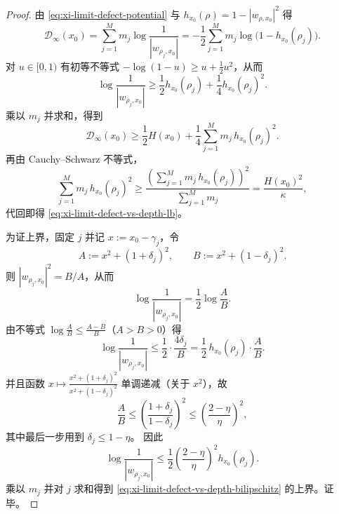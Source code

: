 \begin{proof}
由 \eqref{eq:xi-limit-defect-potential} 与
\(
h_{x_0}(\rho)=1-|w_{\rho,x_0}|^2
\)
得
\[
\mathcal{D}_\infty(x_0)
=\sum_{j=1}^{M} m_j \log\frac{1}{|w_{\rho_j,x_0}|}
=-\frac12\sum_{j=1}^{M} m_j\log\bigl(1-h_{x_0}(\rho_j)\bigr).
\]
对 \(u\in[0,1)\) 有初等不等式 \(-\log(1-u)\ge u+\frac12u^2\)，从而
\[
\log\frac{1}{|w_{\rho_j,x_0}|}
\ge \frac12 h_{x_0}(\rho_j)+\frac14 h_{x_0}(\rho_j)^2.
\]
乘以 \(m_j\) 并求和，得到
\[
\mathcal{D}_\infty(x_0)
\ge \frac12 H(x_0)+\frac14\sum_{j=1}^{M}m_j\,h_{x_0}(\rho_j)^2.
\]
再由 Cauchy--Schwarz 不等式，
\[
\sum_{j=1}^{M}m_j\,h_{x_0}(\rho_j)^2
\ge \frac{\left(\sum_{j=1}^{M}m_j\,h_{x_0}(\rho_j)\right)^2}{\sum_{j=1}^{M}m_j}
=\frac{H(x_0)^2}{\kappa},
\]
代回即得 \eqref{eq:xi-limit-defect-vs-depth-lb}。
\par
为证上界，固定 \(j\) 并记 \(x:=x_0-\gamma_j\)，令
\[
A:=x^2+(1+\delta_j)^2,\qquad B:=x^2+(1-\delta_j)^2.
\]
则 \(|w_{\rho_j,x_0}|^2=B/A\)，从而
\[
\log\frac{1}{|w_{\rho_j,x_0}|}=\frac12\log\frac{A}{B}.
\]
由不等式 \(\log\frac{A}{B}\le \frac{A-B}{B}\)（\(A>B>0\)）得
\[
\log\frac{1}{|w_{\rho_j,x_0}|}
\le \frac12\cdot\frac{4\delta_j}{B}
=\frac12\,h_{x_0}(\rho_j)\cdot\frac{A}{B}.
\]
并且函数 \(x\mapsto \frac{x^2+(1+\delta_j)^2}{x^2+(1-\delta_j)^2}\) 单调递减（关于 \(x^2\)），故
\[
\frac{A}{B}\le \left(\frac{1+\delta_j}{1-\delta_j}\right)^2
\le \left(\frac{2-\eta}{\eta}\right)^2,
\]
其中最后一步用到 \(\delta_j\le 1-\eta\)。
因此
\[
\log\frac{1}{|w_{\rho_j,x_0}|}
\le \frac12\left(\frac{2-\eta}{\eta}\right)^2 h_{x_0}(\rho_j).
\]
乘以 \(m_j\) 并对 \(j\) 求和得到 \eqref{eq:xi-limit-defect-vs-depth-bilipschitz} 的上界。证毕。
\end{proof}

\endinput
